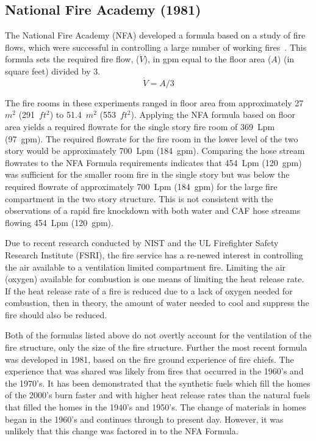 \documentclass[12pt,oneside]{book}
\begin{document}
\subsection{National Fire Academy (1981)}
The National Fire Academy (NFA) developed a formula based on a study of fire flows, which were successful in controlling a large number of working fires~\cite{Klaene:1}. This formula sets the required fire flow, ($\dot{V}$), in gpm equal to the floor area ($A$) (in square feet) divided by 3.
\begin{equation}\label{eq:nfa_form}
\dot{V} = A / 3
\end{equation}

The fire rooms in these experiments ranged in floor area from approximately 27~$m^2$ (291~$ft^2$) to 51.4~$m^2$ (553~$ft^2$). Applying the NFA formula based on floor area yields a required flowrate for the single story fire room of 369~Lpm (97~gpm). The required flowrate for the fire room in the lower level of the two story would be approximately 700~Lpm (184~gpm). Comparing the hose stream flowrates to the NFA Formula requirements indicates that 454~Lpm (120~gpm) was sufficient for the smaller room fire in the single story but was below the required flowrate of approximately 700~Lpm (184~gpm) for the large fire compartment in the two story structure. This is not consistent with the observations of a rapid fire knockdown with both water and CAF hose streams flowing 454~Lpm (120~gpm). 

Due to recent research conducted by NIST and the UL Firefighter Safety Research Institute (FSRI), the fire service has a re-newed interest in controlling the air available to a ventilation limited compartment fire. Limiting the air (oxygen) available for combustion is one means of limiting the heat release rate. If the heat release rate of a fire is reduced due to a lack of oxygen needed for combustion, then in theory, the amount of water needed to cool and suppress the fire should also be reduced.    

Both of the formulas listed above do not overtly account for the ventilation of the fire structure, only the size of the fire structure. Further the most recent formula was developed in 1981, based on the fire ground experience of fire chiefs. The experience that was shared was likely from fires that occurred in the 1960's and the 1970's. It has been demonstrated that the synthetic fuels which fill the homes of the 2000's burn faster and with higher heat release rates than the natural fuels that filled the homes in the 1940's and 1950's. The change of materials in homes began in the 1960's and continues through to present day. However, it was unlikely that this change was factored in to the NFA Formula.   
\end{document}
